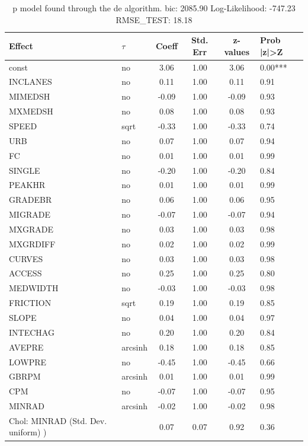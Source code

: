 \begin{table}
	\caption{p model found through the de algorithm. bic: 2085.90 Log-Likelihood: -747.23 RMSE_TEST: 18.18}
	\begin{center}
		\begin{tabular}{|l|l|c|c|c|l|}
			\hline
			Effect & $\tau$ & Coeff & Std. Err & z-values & Prob |z|>Z \\
			\hline
			const & no & 3.06 & 1.00 & 3.06 & 0.00*** \\
			\hline
			INCLANES & no & 0.11 & 1.00 & 0.11 & 0.91 \\
			\hline
			MIMEDSH & no & -0.09 & 1.00 & -0.09 & 0.93 \\
			\hline
			MXMEDSH & no & 0.08 & 1.00 & 0.08 & 0.93 \\
			\hline
			SPEED & sqrt & -0.33 & 1.00 & -0.33 & 0.74 \\
			\hline
			URB & no & 0.07 & 1.00 & 0.07 & 0.94 \\
			\hline
			FC & no & 0.01 & 1.00 & 0.01 & 0.99 \\
			\hline
			SINGLE & no & -0.20 & 1.00 & -0.20 & 0.84 \\
			\hline
			PEAKHR & no & 0.01 & 1.00 & 0.01 & 0.99 \\
			\hline
			GRADEBR & no & 0.06 & 1.00 & 0.06 & 0.95 \\
			\hline
			MIGRADE & no & -0.07 & 1.00 & -0.07 & 0.94 \\
			\hline
			MXGRADE & no & 0.03 & 1.00 & 0.03 & 0.98 \\
			\hline
			MXGRDIFF & no & 0.02 & 1.00 & 0.02 & 0.99 \\
			\hline
			CURVES & no & 0.03 & 1.00 & 0.03 & 0.98 \\
			\hline
			ACCESS & no & 0.25 & 1.00 & 0.25 & 0.80 \\
			\hline
			MEDWIDTH & no & -0.03 & 1.00 & -0.03 & 0.98 \\
			\hline
			FRICTION & sqrt & 0.19 & 1.00 & 0.19 & 0.85 \\
			\hline
			SLOPE & no & 0.04 & 1.00 & 0.04 & 0.97 \\
			\hline
			INTECHAG & no & 0.20 & 1.00 & 0.20 & 0.84 \\
			\hline
			AVEPRE & arcsinh & 0.18 & 1.00 & 0.18 & 0.85 \\
			\hline
			LOWPRE & no & -0.45 & 1.00 & -0.45 & 0.66 \\
			\hline
			GBRPM & arcsinh & 0.01 & 1.00 & 0.01 & 0.99 \\
			\hline
			CPM & no & -0.07 & 1.00 & -0.07 & 0.95 \\
			\hline
			MINRAD & arcsinh & -0.02 & 1.00 & -0.02 & 0.98 \\
			\hline
			 Chol: MINRAD (Std. Dev. uniform) ) &  & 0.07 & 0.07 & 0.92 & 0.36 \\
			\hline
		\end{tabular}
	\end{center}
\end{table}
